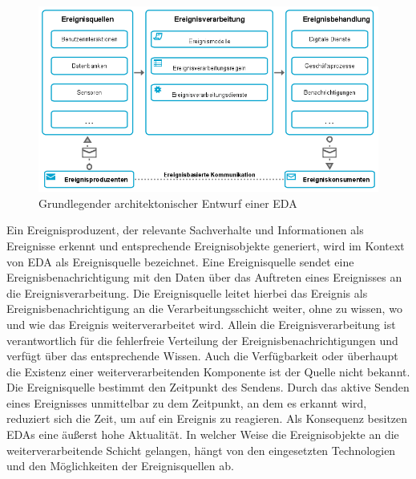 \begin{figure}[H]
	\centering 
    \includegraphics[width=\textwidth]{img/Ereignisverarbitungablauf.png}	
    \caption[Grundlegender architektonischer Entwurf einer EDA]
    {Grundlegender architektonischer Entwurf einer EDA \protect\footnotemark}
    \label{fig:Grundlegender architektonischer Entwurf einer EDA}
\end{figure}
\newpage
Ein Ereignisproduzent, der relevante Sachverhalte und Informationen als Ereignisse erkennt und entsprechende Ereignisobjekte generiert, wird im Kontext von \ac{EDA} als Ereignisquelle bezeichnet.  
\cite{Bruns.2010}
Eine Ereignisquelle sendet eine Ereignisbenachrichtigung mit den Daten über das Auftreten eines Ereignisses an die Ereignisverarbeitung. 
Die Ereignisquelle leitet hierbei das Ereignis als Ereignisbenachrichtigung an die Verarbeitungsschicht weiter, ohne zu wissen, wo und wie das Ereignis weiterverarbeitet wird. 
Allein die Ereignisverarbeitung ist verantwortlich für die fehlerfreie Verteilung der Ereignisbenachrichtigungen und verfügt über das entsprechende Wissen. 
Auch die Verfügbarkeit oder überhaupt die Existenz einer weiterverarbeitenden Komponente ist der Quelle nicht bekannt. 
\cite{Bruns.2010}
Die Ereignisquelle bestimmt den Zeitpunkt des Sendens. 
Durch das aktive Senden eines Ereignisses unmittelbar zu dem Zeitpunkt, an dem es erkannt wird, reduziert sich die Zeit, um auf ein Ereignis zu reagieren. 
Als Konsequenz besitzen EDAs eine äußerst hohe Aktualität.
In welcher Weise die Ereignisobjekte an die weiterverarbeitende Schicht gelangen, hängt von den eingesetzten Technologien und den Möglichkeiten der Ereignisquellen ab.
\cite{Hedtstuck.2017}

